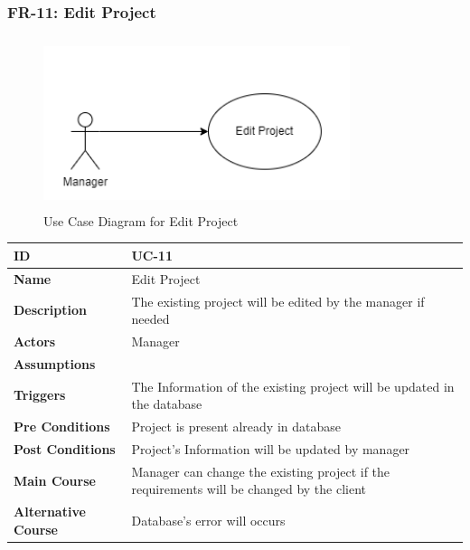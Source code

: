     \newpage

    \subsubsection{FR-11: Edit Project}
    \begin{figure}[H]
        \includegraphics[height=5cm, width=0.8\textwidth]{./diagrams/Use Case/u11.png}
        \centering 
        \caption{Use Case Diagram for Edit Project}
        \label{fig:Usecase1}
        \end{figure}
        
    \begin{center}
        \begin{tabularx}{\textwidth}{|l|X|}
            \hline
            \textbf{ID} & UC-11 \\
            \hline
            \textbf{Name} & Edit Project \\
            \hline
            \textbf{Description} & The existing project will be edited by the manager if needed  \\
            \hline
            \textbf{Actors} & Manager \\
            \hline
            \textbf{Assumptions} &  \\
            \hline
            \textbf{Triggers} & The Information of the existing project will be updated in the database \\
            \hline
            \textbf{Pre Conditions} & Project is present already in database \\
            \hline
            \textbf{Post Conditions} & Project's Information will be updated by manager \\
            \hline
            \textbf{Main Course} & Manager can change the existing project if the requirements will be changed by the client \\
            \hline
            \textbf{Alternative Course} & Database's error will occurs \\
            \hline
            
        \end{tabularx}
    \end{center}
    \newpage
    

